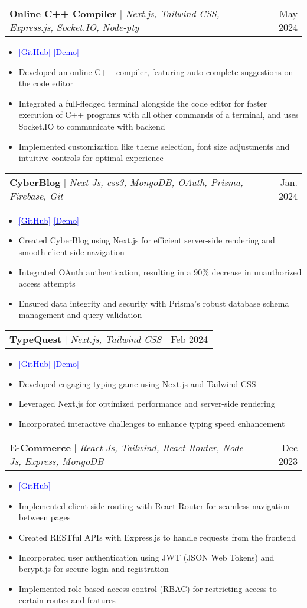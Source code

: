 \documentclass[letterpaper,11pt]{article}
\makeatletter
\newcommand{\resumeItem}[1]{
  \item\small{
    {#1 \vspace{-2pt}}
  }
}
\newcommand{\resumeProjectHeading}[2]{
    \item
    \begin{tabular*}{0.97\textwidth}{l@{\extracolsep{\fill}}r}
      \small#1 & #2 \\
    \end{tabular*}\vspace{-7pt}
}
\newcommand{\bluehref}[2]{\href{#1}{\textcolor{blue}{#2}}}
\newcommand{\resumeItemListStart}{\begin{itemize}}
\newcommand{\resumeItemListEnd}{\end{itemize}\vspace{-5pt}}
\makeatother
\begin{document}
    \resumeProjectHeading
        {\textbf{Online C++ Compiler} $|$ \footnotesize\emph{Next.js, Tailwind CSS, Express.js, Socket.IO, Node-pty}}{May 2024}
        \resumeItemListStart
        \resumeItem{{\bluehref{https://github.com/Goutam-04/onlineIDE}{[GitHub]} \bluehref{https://online-cpp-compiler.vercel.app/}{[Demo]}}}
            \resumeItem{Developed an online C++ compiler, featuring auto-complete suggestions on the code editor}
            \resumeItem{Integrated a full-fledged terminal alongside the code editor for faster execution of C++ programs with all other commands of a terminal, and uses Socket.IO to communicate with backend}
            \resumeItem{Implemented customization like theme selection, font size adjustments and intuitive controls for optimal experience}
          \resumeItemListEnd
          \resumeProjectHeading
            {\textbf{CyberBlog} $|$ \footnotesize\emph{Next Js, css3, MongoDB, OAuth, Prisma, Firebase, Git}}{Jan. 2024}
            \resumeItemListStart
            \resumeItem{{\bluehref{https://github.com/Goutam-04/Blogging}{[GitHub]} \bluehref{https://blogging-smoky.vercel.app/}{[Demo]}}}
                \resumeItem{Created CyberBlog using Next.js for efficient server-side rendering and smooth client-side navigation}
                \resumeItem{Integrated OAuth authentication, resulting in a 90\% decrease in unauthorized access attempts}
                \resumeItem{Ensured data integrity and security with Prisma's robust database schema management and query validation}
      
            \resumeItemListEnd
       \resumeProjectHeading
    {\textbf{TypeQuest} $|$  \footnotesize\emph{Next.js, Tailwind CSS}}{Feb 2024}
    
        \resumeItemListStart
        \resumeItem{{\bluehref{https://github.com/Goutam-04/Typing-game}{[GitHub]} \bluehref{https://typing-game-silk.vercel.app/}{[Demo]}}}

        \resumeItem{Developed engaging typing game using Next.js and Tailwind CSS}
        \resumeItem{Leveraged Next.js for optimized performance and server-side rendering}
        \resumeItem{Incorporated interactive challenges to enhance typing speed enhancement}
          \resumeItemListEnd
    

        \resumeProjectHeading
        {\textbf{E-Commerce} $|$ \footnotesize\emph{React Js, Tailwind, React-Router, Node Js, Express, MongoDB}}{Dec 2023}
        \resumeItemListStart
        \resumeItem{{\bluehref{https://github.com/Goutam-04/E-Commerce}{[GitHub]}}}
            \resumeItem{Implemented client-side routing with React-Router for seamless navigation between pages}
            \resumeItem{Created RESTful APIs with Express.js to handle requests from the frontend}
            \resumeItem{Incorporated user authentication using JWT (JSON Web Tokens) and bcrypt.js for secure login and registration}
            \resumeItem{Implemented role-based access control (RBAC) for restricting access to certain routes and features}
          \resumeItemListEnd
        
\end{document}
